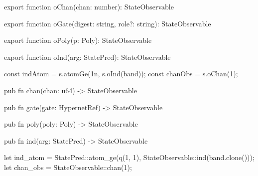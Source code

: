\begin{tssrc}
export function oChan(chan: number): StateObservable

export function oGate(digest: string, role?: string): StateObservable

export function oPoly(p: Poly): StateObservable

export function oInd(arg: StatePred): StateObservable
\end{tssrc}
\begin{tssrc}
const indAtom = s.atomGe(1n, s.oInd(band));
const chanObs = s.oChan(1);
\end{tssrc}
\begin{rustsrc}
pub fn chan(chan: u64) -> StateObservable

pub fn gate(gate: HypernetRef) -> StateObservable

pub fn poly(poly: Poly) -> StateObservable

pub fn ind(arg: StatePred) -> StateObservable
\end{rustsrc}
\begin{rustsrc}
let ind_atom = StatePred::atom_ge(q(1, 1), StateObservable::ind(band.clone()));
let chan_obs = StateObservable::chan(1);
\end{rustsrc}
